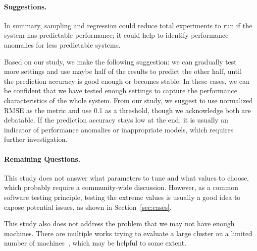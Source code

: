 



 

\vspace{-.1in}
\paragraph{Suggestions.}
In summary, sampling and regression could reduce total experiments
to run if the system has predictable performance; it could help to identify performance anomalies
for less predictable systems.

Based on our study, we
make the following suggestion: we can gradually test more settings and use maybe half of the results
to predict the other half, until the prediction accuracy is good enough
or becomes stable.
In these cases, we can be confident that we have tested enough settings to capture
the performance characteristics of the whole system.
From our study, we suggest to use normalized RMSE as the metric and use
0.1 as a threshold, though we acknowledge both
are debatable.
If the prediction accuracy stays low at the end, it is usually an indicator of performance
anomalies or inappropriate models, which requires further investigation.

\vspace{-.1in}
\paragraph{Remaining Questions.}
This study does not answer what parameters to tune and what values to choose,
which probably require a community-wide discussion. However, as a common software testing principle,
testing the extreme
values is usually a good idea to expose potential issues, as shown in Section~\ref{sec:cases}.

This study also does not address the problem that we may not have enough machines.
There are multiple works trying to evaluate a large cluster on a
limited number of machines~\cite{Gupta08DieCast,Agrawal11Emulating,Wang14Exalt,Shi2018Extrapolation,Stuardo2019ScaleCheck}, which may be helpful to some extent. 



